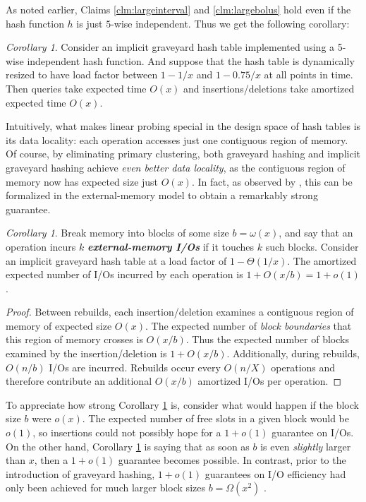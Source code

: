 \documentclass[10pt]{article}
\theoremstyle{remark}
\newtheorem{corollary}[thm]{Corollary}
\theoremstyle{remark}
\newcommand{\defn}[1]{\textbf{\emph{#1}}}
\begin{document}
As noted earlier, Claims \ref{clm:largeinterval} and \ref{clm:largebolus} hold even if the hash function $h$ is just $5$-wise independent. Thus we get the following corollary:

\begin{corollary}
Consider an implicit graveyard hash table implemented using a 5-wise independent hash function. And suppose that the hash table is dynamically resized to have load factor between $1 - 1/x$ and $1 - 0.75/x$ at all points in time. Then queries take expected time $O(x)$ and insertions/deletions take amortized expected time $O(x)$. 
\end{corollary}

Intuitively, what makes linear probing special in the design space of hash tables is its data locality: each operation accesses just one contiguous region of memory. Of course, by eliminating primary clustering, both graveyard hashing and implicit graveyard hashing achieve \emph{even better data locality}, as the contiguous region of memory now has expected size just $O(x)$. In fact, as observed by \cite{?}, this can be formalized in the external-memory model \cite{?} to obtain a remarkably strong guarantee.

\begin{corollary}
Break memory into blocks of some size $b = \omega(x)$, and say that an operation incurs $k$ \defn{external-memory I/Os} \cite{vitter} if it touches $k$ such blocks. Consider an implicit graveyard hash table at a load factor of $1 - \Theta(1/x)$. The amortized expected number of I/Os incurred by each operation is $1 + O(x/b) = 1 + o(1)$.
\label{cor:externalmemory}
\end{corollary}
\begin{proof}
Between rebuilds, each insertion/deletion examines a contiguous region of memory of expected size $O(x)$. The expected number of \emph{block boundaries} that this region of memory crosses is $O(x/b)$. Thus the expected number of blocks examined by the insertion/deletion is $1 + O(x/b)$. Additionally, during rebuilds, $O(n / b)$ I/Os are incurred. Rebuilds occur every $O(n / X)$ operations and therefore contribute an additional $O(x/b)$ amortized I/Os per operation.
\end{proof}

To appreciate how strong Corollary \ref{cor:externalmemory} is, consider what would happen if the block size $b$ were $o(x)$. The expected number of free slots in a given block would be $o(1)$, so insertions could not possibly hope for a $1 + o(1)$ guarantee on I/Os. On the other hand, Corollary \ref{cor:externalmemory} is saying that as soon as $b$ is even \emph{slightly} larger than $x$, then a $1 + o(1)$ guarantee becomes possible. In contrast, prior to the introduction of graveyard hashing, $1+ o(1)$ guarantees on I/O efficiency had only been achieved for much larger block sizes $b = \Omega(x^2)$ \cite{jensenpagh}.
\end{document}
